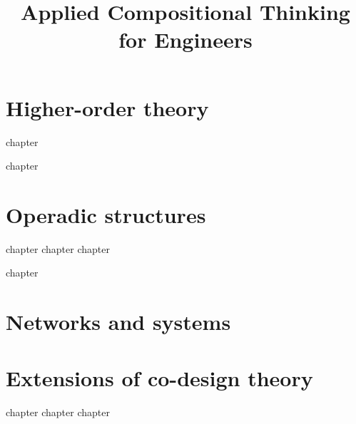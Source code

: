 

\title{Applied Compositional Thinking\\ for Engineers}
\date{}

\tableofcontents

\addtocounter{part}{8}
\addtocounter{chapter}{38}


\part{Higher-order theory}\label{part:higher-order}




{chapter}

{chapter}


\part{Operadic structures}\label{part:operads}


{chapter}
{chapter}
{chapter}

{chapter}


\part{Networks and systems}\label{part:networks}

\chapter{}


\part{Extensions of co-design theory}
{chapter}
{chapter}
{chapter}


\printbibliography
%
%

\printindex

%
%
%
%
%
%
